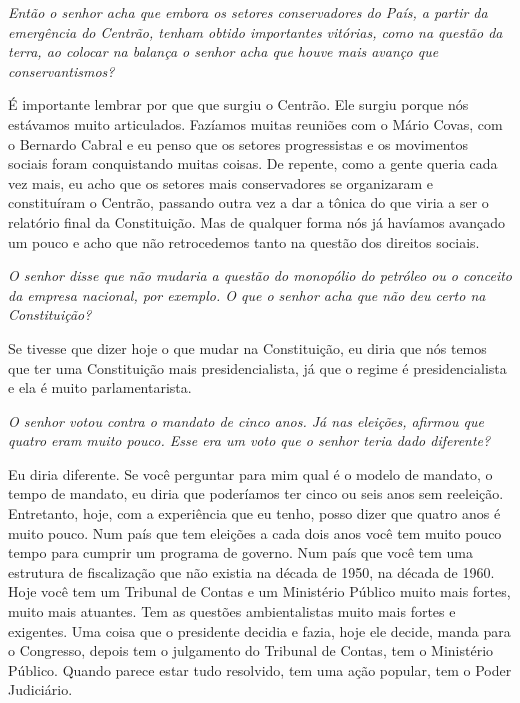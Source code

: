 \medskip

\noindent\emph{Então o senhor acha que embora os setores conservadores do País,
a partir da emergência do Centrão, tenham obtido importantes vitórias,
como na questão da terra, ao colocar na balança o senhor acha que houve
mais avanço que conservantismos?}

É importante lembrar por que que surgiu o Centrão. Ele
surgiu porque nós estávamos muito articulados. Fazíamos muitas reuniões
com o Mário Covas, com o Bernardo Cabral e eu penso que os setores
progressistas e os movimentos sociais foram conquistando muitas coisas.
De repente, como a gente queria cada vez mais, eu acho que os setores
mais conservadores se organizaram e constituíram o Centrão, passando
outra vez a dar a tônica do que viria a ser o relatório final da
Constituição. Mas de qualquer forma nós já havíamos avançado um pouco e
acho que não retrocedemos tanto na questão dos direitos sociais.

\medskip

\noindent\emph{O senhor disse que não mudaria a questão do monopólio do
petróleo ou o conceito da empresa nacional, por exemplo. O que o senhor
acha que não deu certo na Constituição?}

Se tivesse que dizer hoje o que mudar na Constituição, eu
diria que nós temos que ter uma Constituição mais presidencialista, já
que o regime é presidencialista e ela é muito parlamentarista.

\medskip

\noindent\emph{O senhor votou contra o mandato de cinco anos. Já nas eleições,
afirmou que quatro eram muito pouco. Esse era um voto que o senhor teria
dado diferente?}

Eu diria diferente. Se você perguntar para mim qual é o
modelo de mandato, o tempo de mandato, eu diria que poderíamos ter cinco
ou seis anos sem reeleição. Entretanto, hoje, com a experiência que eu
tenho, posso dizer que quatro anos é muito pouco. Num país que tem
eleições a cada dois anos você tem muito pouco tempo para cumprir um
programa de governo. Num país que você tem uma estrutura de fiscalização
que não existia na década de 1950, na década de 1960. Hoje você tem um
Tribunal de Contas e um Ministério Público muito mais fortes, muito mais
atuantes. Tem as questões ambientalistas muito mais fortes e exigentes.
Uma coisa que o presidente decidia e fazia, hoje ele decide, manda para
o Congresso, depois tem o julgamento do Tribunal de Contas, tem o
Ministério Público. Quando parece estar tudo resolvido, tem uma ação
popular, tem o Poder Judiciário.


